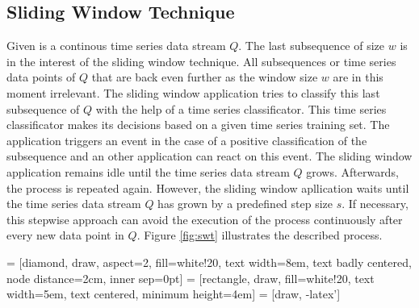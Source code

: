 \subsection{Sliding Window Technique} \label{sliding_window_technique}
Given is a continous time series data stream $Q$. The last subsequence of size $w$ is in the interest of the sliding
window technique. All subsequences or time series data points of $Q$ that are back even further as the window size $w$
are in this moment irrelevant. The sliding window application tries to classify this last subsequence of $Q$ with the
help of a time series classificator. This time series classificator makes its decisions based on a given time series
training set. The application triggers an event in the case of a positive classification of the subsequence and an other
application can react on this event. The sliding window application remains idle until the time series data stream $Q$
grows. Afterwards, the process is repeated again. However, the sliding window apllication waits until the time series
data stream $Q$ has grown by a predefined step size $s$. If necessary, this stepwise approach can avoid the execution of
the process continuously after every new data point in $Q$. Figure \ref{fig:swt} illustrates the described process.

 = [diamond, draw, aspect=2, fill=white!20, text width=8em, text badly centered, node distance=2cm, inner sep=0pt]
 = [rectangle, draw, fill=white!20, text width=5em, text centered, minimum height=4em]
 = [draw, -latex']

